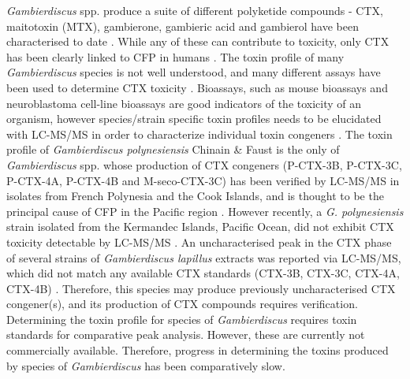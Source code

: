 \documentclass[12pt]{article}
\begin{document}
\emph{Gambierdiscus} spp. produce a suite of different polyketide compounds - CTX, maitotoxin (MTX), gambierone, gambieric acid and gambierol have been characterised to date \citep{satake1993gambierol,nagai1992gambieric,rodriguez2015gambierone,murata1993structure,murata1989structures}. While any of these can contribute to toxicity, only CTX has been clearly linked to CFP in humans \citep{chinain1997intraspecific,holmes1998gambierdiscus}. The toxin profile of many \textit{Gambierdiscus} species is not well understood, and many different assays have been used to determine CTX toxicity \citep{globalcig}. Bioassays, such as mouse bioassays and neuroblastoma cell-line bioassays are good indicators of the toxicity of an organism, however species/strain specific toxin profiles needs to be elucidated with LC-MS/MS in order to characterize individual toxin congeners \citep{diogened2014chemistry}. The toxin profile of \textit{Gambierdiscus polynesiensis} Chinain \& Faust is the only of \emph{Gambierdiscus} spp. whose production of CTX congeners (P-CTX-3B, P-CTX-3C, P-CTX-4A, P-CTX-4B and M-seco-CTX-3C) has been verified by LC-MS/MS in isolates from French Polynesia and the Cook Islands, and is thought to be the principal cause of CFP in the Pacific region \citep{chinain2010growth,rhodes2014production}. However recently, a \emph{G. polynesiensis} strain isolated from the Kermandec Islands, Pacific Ocean, did not exhibit CTX toxicity detectable by LC-MS/MS  \citep{rhodes2017epiphytic}.
An uncharacterised peak in the CTX phase of several strains of \emph{Gambierdiscus lapillus} extracts was reported via LC-MS/MS, which did not match any available CTX standards (CTX-3B, CTX-3C, CTX-4A, CTX-4B) \citep{kretzschmar2016characterization}. Therefore, this species may produce previously uncharacterised CTX congener(s), and its production of CTX compounds requires verification.
Determining the toxin profile for species of \textit{Gambierdiscus} requires toxin standards for comparative peak analysis. However, these are currently not commercially available. Therefore, progress in determining the toxins produced by species of \emph{Gambierdiscus} has been comparatively slow.\\

\end{document}

